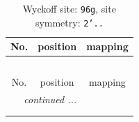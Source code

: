 \documentclass[fleqn,8pt]{jsarticle}
\begin{document}
\renewcommand{\arraystretch}{1.2}
\begin{longtable}{ccc}
\caption{Wyckoff site: {\tt 96g}, site symmetry: {\tt 2'..}}
 \\
 \hline \hline
No. & position & mapping \\ \hline \endfirsthead

\multicolumn{2}{l}{\tablename\ \thetable{}} \\
 \hline \hline
No. & position & mapping \\ \hline \endhead

 \hline \hline
\multicolumn{2}{r}{\footnotesize\it continued ...} \\ \endfoot

 \hline \hline
\multicolumn{2}{r}{} \\ \endlastfoot


\end{longtable}
\end{document}
